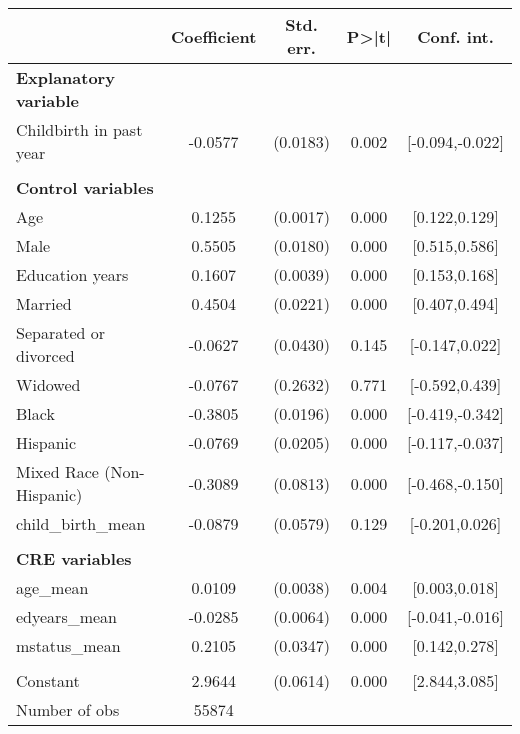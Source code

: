 {
\def\sym#1{\ifmmode^{#1}\else\(^{#1}\)\fi}
\begin{tabular}{l*{1}{cccc}}
\toprule
                    & Coefficient&   Std. err.&       P>|t|&  Conf. int.\\
\midrule
\textbf{Explanatory variable}&            &            &            &            \\
Childbirth in past year&     -0.0577&    (0.0183)&       0.002&[-0.094,-0.022]\\
\\ \textbf{Control variables}&            &            &            &            \\
Age                 &      0.1255&    (0.0017)&       0.000&[0.122,0.129]\\
Male                &      0.5505&    (0.0180)&       0.000&[0.515,0.586]\\
Education years     &      0.1607&    (0.0039)&       0.000&[0.153,0.168]\\
Married             &      0.4504&    (0.0221)&       0.000&[0.407,0.494]\\
Separated or divorced&     -0.0627&    (0.0430)&       0.145&[-0.147,0.022]\\
Widowed             &     -0.0767&    (0.2632)&       0.771&[-0.592,0.439]\\
Black               &     -0.3805&    (0.0196)&       0.000&[-0.419,-0.342]\\
Hispanic            &     -0.0769&    (0.0205)&       0.000&[-0.117,-0.037]\\
Mixed Race (Non-Hispanic)&     -0.3089&    (0.0813)&       0.000&[-0.468,-0.150]\\
child\_birth\_mean    &     -0.0879&    (0.0579)&       0.129&[-0.201,0.026]\\
\\ \textbf{CRE variables}&            &            &            &            \\
age\_mean            &      0.0109&    (0.0038)&       0.004&[0.003,0.018]\\
edyears\_mean        &     -0.0285&    (0.0064)&       0.000&[-0.041,-0.016]\\
mstatus\_mean        &      0.2105&    (0.0347)&       0.000&[0.142,0.278]\\
                    &            &            &            &            \\
Constant            &      2.9644&    (0.0614)&       0.000&[2.844,3.085]\\
\midrule
Number of obs       &       55874&            &            &            \\

\end{tabular}}
